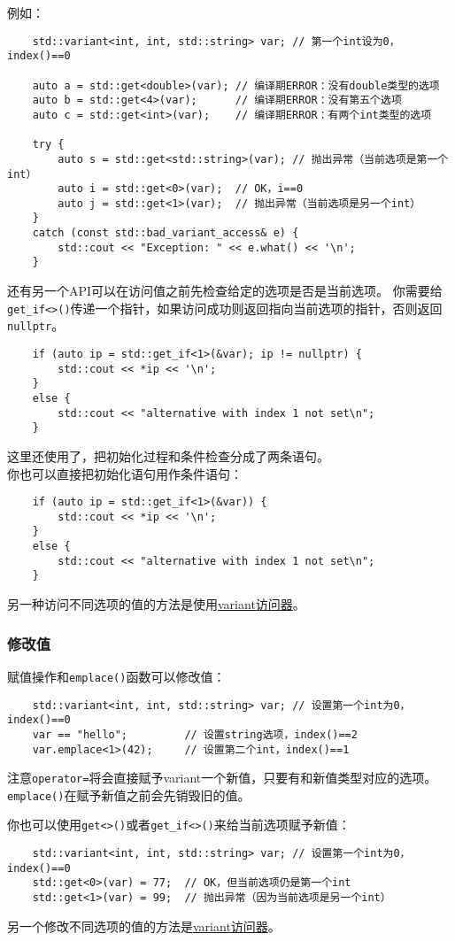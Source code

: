例如：
\begin{lstlisting}
    std::variant<int, int, std::string> var; // 第一个int设为0，index()==0

    auto a = std::get<double>(var); // 编译期ERROR：没有double类型的选项
    auto b = std::get<4>(var);      // 编译期ERROR：没有第五个选项
    auto c = std::get<int>(var);    // 编译期ERROR：有两个int类型的选项

    try {
        auto s = std::get<std::string>(var); // 抛出异常（当前选项是第一个int）
        auto i = std::get<0>(var);  // OK，i==0
        auto j = std::get<1>(var);  // 抛出异常（当前选项是另一个int）
    }
    catch (const std::bad_variant_access& e) {
        std::cout << "Exception: " << e.what() << '\n';
    }
\end{lstlisting}
还有另一个API可以在访问值之前先检查给定的选项是否是当前选项。
你需要给\texttt{get\_if<>()}传递一个指针，如果访问成功则返回指向当前选项的指针，否则返回\texttt{nullptr}。
\begin{lstlisting}
    if (auto ip = std::get_if<1>(&var); ip != nullptr) {
        std::cout << *ip << '\n';
    }
    else {
        std::cout << "alternative with index 1 not set\n";
    }
\end{lstlisting}
这里还使用了，把初始化过程和条件检查分成了两条语句。\\
你也可以直接把初始化语句用作条件语句：
\begin{lstlisting}
    if (auto ip = std::get_if<1>(&var)) {
        std::cout << *ip << '\n';
    }
    else {
        std::cout << "alternative with index 1 not set\n";
    }
\end{lstlisting}
另一种访问不同选项的值的方法是使用\hyperref[ch16.3.3]{variant访问器}。

\subsubsection*{修改值}
赋值操作和\texttt{emplace()}函数可以修改值：
\begin{lstlisting}
    std::variant<int, int, std::string> var; // 设置第一个int为0，index()==0
    var == "hello";         // 设置string选项，index()==2
    var.emplace<1>(42);     // 设置第二个int，index()==1
\end{lstlisting}
注意\texttt{operator=}将会直接赋予variant一个新值，只要有和新值类型对应的选项。
\texttt{emplace()}在赋予新值之前会先销毁旧的值。

你也可以使用\texttt{get<>()}或者\texttt{get\_if<>()}来给当前选项赋予新值：
\begin{lstlisting}
    std::variant<int, int, std::string> var; // 设置第一个int为0，index()==0
    std::get<0>(var) = 77;  // OK，但当前选项仍是第一个int
    std::get<1>(var) = 99;  // 抛出异常（因为当前选项是另一个int）
\end{lstlisting}
另一个修改不同选项的值的方法是\hyperref[ch16.3.3]{variant访问器}。

